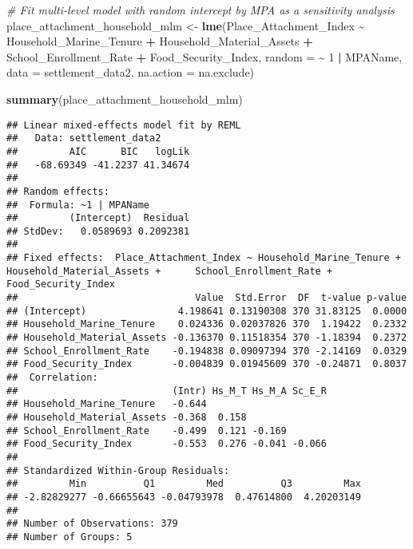 \documentclass[
]{article}
\newenvironment{Shaded}{\begin{snugshade}}{\end{snugshade}}
\newcommand{\AttributeTok}[1]{\textcolor[rgb]{0.13,0.29,0.53}{#1}}
\newcommand{\CommentTok}[1]{\textcolor[rgb]{0.56,0.35,0.01}{\textit{#1}}}
\newcommand{\DecValTok}[1]{\textcolor[rgb]{0.00,0.00,0.81}{#1}}
\newcommand{\FunctionTok}[1]{\textcolor[rgb]{0.13,0.29,0.53}{\textbf{#1}}}
\newcommand{\NormalTok}[1]{#1}
\newcommand{\OtherTok}[1]{\textcolor[rgb]{0.56,0.35,0.01}{#1}}
\newcommand{\SpecialCharTok}[1]{\textcolor[rgb]{0.81,0.36,0.00}{\textbf{#1}}}
\begin{document}
\begin{Shaded}
\begin{Highlighting}[]
\CommentTok{\# Fit multi{-}level model with random intercept by MPA as a sensitivity analysis}
\NormalTok{place\_attachment\_household\_mlm }\OtherTok{\textless{}{-}} \FunctionTok{lme}\NormalTok{(Place\_Attachment\_Index }\SpecialCharTok{\textasciitilde{}} 
\NormalTok{                            Household\_Marine\_Tenure }\SpecialCharTok{+}
\NormalTok{                            Household\_Material\_Assets }\SpecialCharTok{+}
\NormalTok{                            School\_Enrollment\_Rate }\SpecialCharTok{+}
\NormalTok{                            Food\_Security\_Index, }\AttributeTok{random =} \SpecialCharTok{\textasciitilde{}} \DecValTok{1} \SpecialCharTok{|}\NormalTok{ MPAName, }\AttributeTok{data =}\NormalTok{ settlement\_data2, }\AttributeTok{na.action =}\NormalTok{ na.exclude)}
\end{Highlighting}
\end{Shaded}

\begin{Shaded}
\begin{Highlighting}[]
\FunctionTok{summary}\NormalTok{(place\_attachment\_household\_mlm)}
\end{Highlighting}
\end{Shaded}

\begin{verbatim}
## Linear mixed-effects model fit by REML
##   Data: settlement_data2 
##         AIC      BIC   logLik
##   -68.69349 -41.2237 41.34674
## 
## Random effects:
##  Formula: ~1 | MPAName
##         (Intercept)  Residual
## StdDev:   0.0589693 0.2092381
## 
## Fixed effects:  Place_Attachment_Index ~ Household_Marine_Tenure + Household_Material_Assets +      School_Enrollment_Rate + Food_Security_Index 
##                               Value  Std.Error  DF  t-value p-value
## (Intercept)                4.198641 0.13190308 370 31.83125  0.0000
## Household_Marine_Tenure    0.024336 0.02037826 370  1.19422  0.2332
## Household_Material_Assets -0.136370 0.11518354 370 -1.18394  0.2372
## School_Enrollment_Rate    -0.194838 0.09097394 370 -2.14169  0.0329
## Food_Security_Index       -0.004839 0.01945609 370 -0.24871  0.8037
##  Correlation: 
##                           (Intr) Hs_M_T Hs_M_A Sc_E_R
## Household_Marine_Tenure   -0.644                     
## Household_Material_Assets -0.368  0.158              
## School_Enrollment_Rate    -0.499  0.121 -0.169       
## Food_Security_Index       -0.553  0.276 -0.041 -0.066
## 
## Standardized Within-Group Residuals:
##         Min          Q1         Med          Q3         Max 
## -2.82829277 -0.66655643 -0.04793978  0.47614800  4.20203149 
## 
## Number of Observations: 379
## Number of Groups: 5
\end{verbatim}
\end{document}
